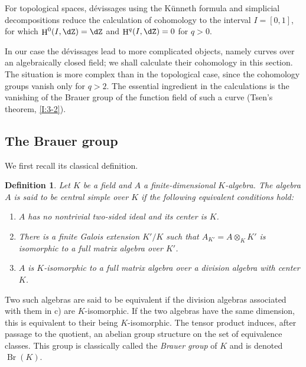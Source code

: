\documentclass[12pt,oneside,english]{smfbook}
\DeclareMathOperator{\br}{Br}
\DeclareMathOperator{\h}{H}
\newtheorem{definition}[subsubsection]{Definition}
\begin{document}
For topological spaces, dévissages using the K\"unneth formula and simplicial decompositions reduce the calculation of cohomology to the interval $I=[0,1]$, for which $\h^0(I,\dZ)=\dZ$ and $\h^q(I,\dZ)=0$ for $q>0$.

In our case the dévissages lead to more complicated objects, namely curves over an algebraically closed field; we shall calculate their cohomology in this section. The situation is more complex than in the topological case, since the cohomology groups vanish only for $q>2$. The essential ingredient in the calculations is the vanishing of the Brauer group of the function field of such a curve (Tsen's theorem, \ref{I:3-2}).

\subsection{The Brauer group}\label{I:3-1}

We first recall its classical definition.

\begin{definition}\label{I:3-1-1}
Let $K$ be a field and $A$ a finite-dimensional $K$-algebra. The algebra $A$ is said to be central simple over $K$ if the following equivalent conditions hold:
\begin{enumerate}[\indent a)]
  \item $A$ has no nontrivial two-sided ideal and its center is $K$.
  \item There is a finite Galois extension $K'/K$ such that $A_{K'}=A\otimes_KK'$ is isomorphic to a full matrix algebra over $K'$.
  \item $A$ is $K$-isomorphic to a full matrix algebra over a division algebra with center $K$.
\end{enumerate}
\end{definition}

Two such algebras are said to be equivalent if the division algebras associated with them in c) are $K$-isomorphic. If the two algebras have the same dimension, this is equivalent to their being $K$-isomorphic. The tensor product induces, after passage to the quotient, an abelian group structure on the set of equivalence classes. This group is classically called the \emph{Brauer group} of $K$ and is denoted $\br(K)$.

\subsubsection{}\label{I:3-1-2}
\end{document}

